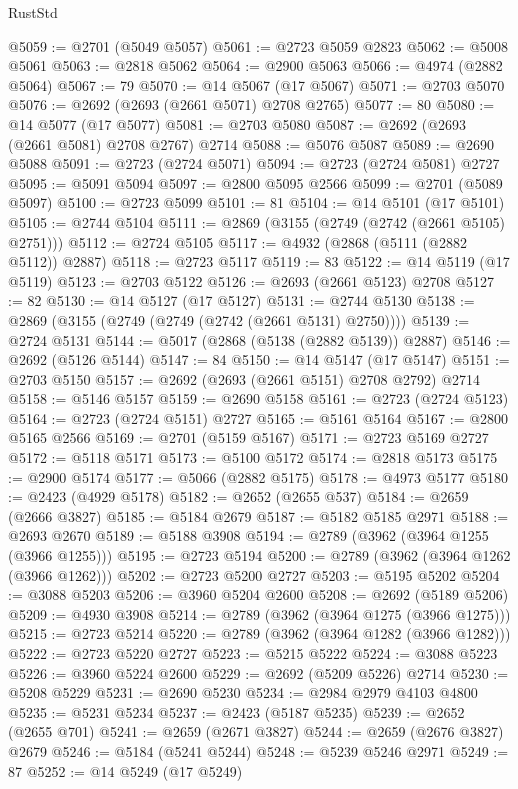 \begin{lexlean}{RustStd}
\begin{coremodule}
@5059 := @2701 (@5049 @5057)
@5061 := @2723 @5059 @2823
@5062 := @5008 @5061
@5063 := @2818 @5062
@5064 := @2900 @5063
@5066 := @4974 (@2882 @5064)
@5067 := 79
@5070 := @14 @5067 (@17 @5067)
@5071 := @2703 @5070
@5076 := @2692 (@2693 (@2661 @5071) @2708 @2765)
@5077 := 80
@5080 := @14 @5077 (@17 @5077)
@5081 := @2703 @5080
@5087 := @2692 (@2693 (@2661 @5081) @2708 @2767) @2714
@5088 := @5076 @5087
@5089 := @2690 @5088
@5091 := @2723 (@2724 @5071)
@5094 := @2723 (@2724 @5081) @2727
@5095 := @5091 @5094
@5097 := @2800 @5095 @2566
@5099 := @2701 (@5089 @5097)
@5100 := @2723 @5099
@5101 := 81
@5104 := @14 @5101 (@17 @5101)
@5105 := @2744 @5104
@5111 := @2869 (@3155 (@2749 (@2742 (@2661 @5105) @2751)))
@5112 := @2724 @5105
@5117 := @4932 (@2868 (@5111 (@2882 @5112)) @2887)
@5118 := @2723 @5117
@5119 := 83
@5122 := @14 @5119 (@17 @5119)
@5123 := @2703 @5122
@5126 := @2693 (@2661 @5123) @2708
@5127 := 82
@5130 := @14 @5127 (@17 @5127)
@5131 := @2744 @5130
@5138 := @2869 (@3155 (@2749 (@2749 (@2742 (@2661 @5131) @2750))))
@5139 := @2724 @5131
@5144 := @5017 (@2868 (@5138 (@2882 @5139)) @2887)
@5146 := @2692 (@5126 @5144)
@5147 := 84
@5150 := @14 @5147 (@17 @5147)
@5151 := @2703 @5150
@5157 := @2692 (@2693 (@2661 @5151) @2708 @2792) @2714
@5158 := @5146 @5157
@5159 := @2690 @5158
@5161 := @2723 (@2724 @5123)
@5164 := @2723 (@2724 @5151) @2727
@5165 := @5161 @5164
@5167 := @2800 @5165 @2566
@5169 := @2701 (@5159 @5167)
@5171 := @2723 @5169 @2727
@5172 := @5118 @5171
@5173 := @5100 @5172
@5174 := @2818 @5173
@5175 := @2900 @5174
@5177 := @5066 (@2882 @5175)
@5178 := @4973 @5177
@5180 := @2423 (@4929 @5178)
@5182 := @2652 (@2655 @537)
@5184 := @2659 (@2666 @3827)
@5185 := @5184 @2679
@5187 := @5182 @5185 @2971
@5188 := @2693 @2670
@5189 := @5188 @3908
@5194 := @2789 (@3962 (@3964 @1255 (@3966 @1255)))
@5195 := @2723 @5194
@5200 := @2789 (@3962 (@3964 @1262 (@3966 @1262)))
@5202 := @2723 @5200 @2727
@5203 := @5195 @5202
@5204 := @3088 @5203
@5206 := @3960 @5204 @2600
@5208 := @2692 (@5189 @5206)
@5209 := @4930 @3908
@5214 := @2789 (@3962 (@3964 @1275 (@3966 @1275)))
@5215 := @2723 @5214
@5220 := @2789 (@3962 (@3964 @1282 (@3966 @1282)))
@5222 := @2723 @5220 @2727
@5223 := @5215 @5222
@5224 := @3088 @5223
@5226 := @3960 @5224 @2600
@5229 := @2692 (@5209 @5226) @2714
@5230 := @5208 @5229
@5231 := @2690 @5230
@5234 := @2984 @2979 @4103 @4800
@5235 := @5231 @5234
@5237 := @2423 (@5187 @5235)
@5239 := @2652 (@2655 @701)
@5241 := @2659 (@2671 @3827)
@5244 := @2659 (@2676 @3827) @2679
@5246 := @5184 (@5241 @5244)
@5248 := @5239 @5246 @2971
@5249 := 87
@5252 := @14 @5249 (@17 @5249)

\end{coremodule}
\end{lexlean}

